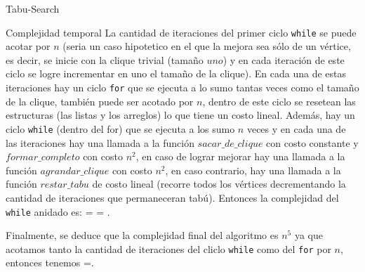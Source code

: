 \begin{section}{Tabu-Search}
\begin{subsection}{Complejidad temporal}
			 La cantidad de iteraciones del primer ciclo \texttt{while} se puede acotar por $n$ (seria un caso hipotetico en el que la mejora sea sólo de un vértice, es decir, se inicie con la clique trivial (tamaño $uno$) y en cada iteración de este ciclo se logre incrementar en uno el tamaño de la clique). En cada una de estas iteraciones hay un ciclo \texttt{for} que se ejecuta a lo sumo tantas veces como el tamaño de la clique, también puede ser acotado por $n$, dentro de este ciclo se resetean las estructuras (las listas y los arreglos) lo que tiene un costo lineal. Además, hay un ciclo \texttt{while} (dentro del for) que se ejecuta a los sumo $n$ veces y en cada una de las iteraciones hay una llamada a la función $sacar\_de\_clique$ con costo constante y $formar\_completo$ con costo $n^2$, en caso de lograr mejorar hay una llamada a la función $agrandar\_clique$ con costo $n^2$, en caso contrario, hay una llamada a la función $restar\_tabu$ de costo lineal (recorre todos los vértices decrementando la cantidad de iteraciones que permaneceran tabú). Entonces la complejidad del \texttt{while} anidado es:   =  = .

			 Finalmente, se deduce que la complejidad final del algoritmo es $n^5$ ya que acotamos tanto la cantidad de iteraciones del cliclo \texttt{while} como del \texttt{for} por $n$, entonces tenemos =.
	\end{subsection}

\end{section}
